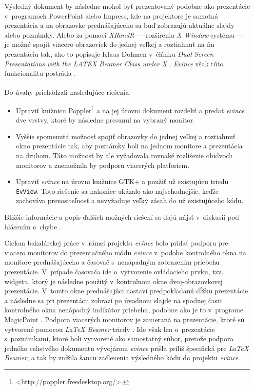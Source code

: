 \documentclass[12pt,oneside,final]{fithesis2}
\begin{document}
Výsledný dokument by následne mohol byť prezentovaný podobne ako prezentácie v~programoch PowerPoint alebo Impress, kde na projektore je samotná prezentácia a na obrazovke prednášajúceho sa buď zobrazujú aktuálne slajdy alebo poznámky. Alebo za pomoci \emph{XRandR} --- rozšírenia \emph{X Window} systému --- je možné spojiť viacero obrazoviek do jednej veľkej a roztiahnuť na ňu prezentáciu tak, ako to popisuje Klaus Dohmen v~článku \emph{Dual Screen Presentations with the LATEX Beamer Class under X} \cite{dohmen}. \emph{Evince} však túto funkcionalitu postráda \cite{evbug}.
\\
\\
Do úvahy prichádzali nasledujúce riešenia:
\begin{itemize}
\item Upraviť knižnicu Poppler\footnote{<http://poppler.freedesktop.org/>.} a na jej úrovni dokument rozdeliť a predať \emph{evince} dve vrstvy, ktoré by následne presunul na vybraný monitor.
\item Vyššie spomenutá možnosť spojiť obrazovky do jednej veľkej a roztiahnuť okno prezentácie tak, aby poznámky boli na jednom monitore a prezentácia na druhom. Táto možnosť by ale vyžadovala rovnaké rozlíšenie obidvoch monitorov a znemožnila by podporu viacerých platforiem.
\item Upraviť \emph{evince} na úrovni knižnice GTK+ a použiť už existujúcu triedu \texttt{EvView}. Toto riešenie sa nakoniec ukázalo ako najschodnejšie, keďže zachováva prenositeľnosť a nevyžaduje veľký zásah do už existujúceho kódu.
\end{itemize}

Bližšie informácie a popis ďalších možných riešení sa dajú nájsť v~diskusii pod hlásením o~chybe \cite{evbug}.

Cieľom bakalárskej práce v~rámci projektu \emph{evince} bolo pridať podporu pre viacero monitorov do prezentačného módu \emph{evince} v~podobe kontrolného okna na monitore prednášajúceho a časovač s~nenápadným zobrazením priebehu prezentácie.  V~prípade časovača ide o~vytvorenie ovládacieho prvku, tzv. widgetu, ktorý je následne použitý v~kontrolnom okne dvoj-obrazovkovej prezentácie. V~tomto okne prednášajúci nastaví predpokladanú dĺžku prezentácie a následne sa pri prezentácii zobrazí po úvodnom slajde na spodnej časti kontrolného okna nenápadný indikátor priebehu, podobne ako je to v~programe MagicPoint \cite{mgp}. Podpora viacerých monitorov je zameraná na prezentácie, ktoré sú vytvorené pomocou \emph{LaTeX Beamer} triedy \cite{beamer}. Ide však len o~prezentácie s~poznámkami, ktoré boli vytvorené ako samostatný súbor, pretože podpora jedného celistvého dokumentu vývojárom \emph{evince} prišla príliš špecifická pre \emph{LaTeX Beamer}, a tak by znížila šancu začlenenia výsledného kódu do projektu \emph{evince}.
\end{document}
